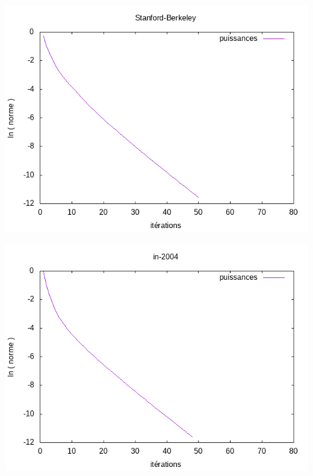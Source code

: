 		\begin{minipage}[c]{.46\linewidth}
			\begin{center}
				\includegraphics[scale=0.5]{plot-Stanford-Berkeley.png}
			\end{center}
		\end{minipage} \hfill
		\begin{minipage}[c]{.46\linewidth}
			\begin{center}
				\includegraphics[scale=0.5]{plot-in-2004.png}
			\end{center}
		\end{minipage}\\

